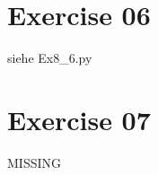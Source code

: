 \documentclass[11pt,a4paper]{scrartcl}
\begin{document}
\section*{Exercise 06}
siehe Ex8\_6.py

\section*{Exercise 07}
MISSING
\end{document}
